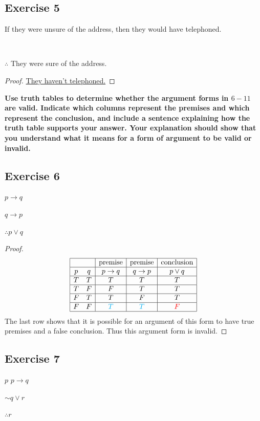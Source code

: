 \documentclass[14pt]{extarticle}
\newcommand{\fbl}{\underline{\hspace{1cm}}\,\,}
\begin{document}
\subsection{Exercise 5}
If they were unsure of the address, then they would have telephoned.

\fbl

$\therefore$ They were sure of the address.

\begin{proof}
\underline{They haven't telephoned.}
\end{proof}

{\bf \color{cyan} Use truth tables to determine whether the argument forms in $6-11$ are valid. Indicate which columns represent the premises and which represent the conclusion, and include a sentence explaining how the truth table supports your answer. Your explanation should show that you understand what it
means for a form of argument to be valid or invalid.}

\subsection{Exercise 6}
$p \to q$

$q \to p$

$\therefore p \vee q$

\begin{proof}
$$
\begin{array}{|cc|c|c|c|}
\hline
& & \text{premise} & \text{premise} & \text{conclusion} \\ \hline
p & q & p \to q & q \to p & p \vee q \\
\hline
T & T & T & T & T \\
\hline
T & F & F & T & T \\
\hline
F & T & T & F & T \\
\hline
F & F & \color{cyan} T & \color{cyan} T & \color{red} F \\
\hline
\end{array}
$$
The last row shows that it is possible for an argument of
this form to have true premises and a false conclusion. Thus this argument form is invalid.
\end{proof}

\subsection{Exercise 7} $p$
$p \to q$

${\sim q} \vee r$

$\therefore r$
\end{document}
